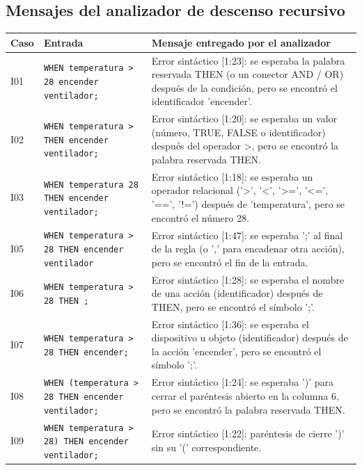 \subsection{Mensajes del analizador de descenso recursivo}
\begin{longtable}{@{}l >{\raggedright\arraybackslash}p{5.2cm} >{\raggedright\arraybackslash}p{8.4cm}@{}}
\toprule
\textbf{Caso} & \textbf{Entrada} & \textbf{Mensaje entregado por el analizador} \\
\midrule
\endhead
I01 & \footnotesize \texttt{WHEN temperatura > 28 encender ventilador;} & \footnotesize Error sintáctico [1:23]: se esperaba la palabra reservada THEN (o un conector AND / OR) después de la condición, pero se encontró el identificador 'encender'. \\
\addlinespace[2pt]
I02 & \footnotesize \texttt{WHEN temperatura > THEN encender ventilador;} & \footnotesize Error sintáctico [1:20]: se esperaba un valor (número, TRUE, FALSE o identificador) después del operador >, pero se encontró la palabra reservada THEN. \\
\addlinespace[2pt]
I03 & \footnotesize \texttt{WHEN temperatura 28 THEN encender ventilador;} & \footnotesize Error sintáctico [1:18]: se esperaba un operador relacional ('>', '<', '>=', '<=', '==', '!=') después de 'temperatura', pero se encontró el número 28. \\
\addlinespace[2pt]
I05 & \footnotesize \texttt{WHEN temperatura > 28 THEN encender ventilador} & \footnotesize Error sintáctico [1:47]: se esperaba ';' al final de la regla (o ',' para encadenar otra acción), pero se encontró el fin de la entrada. \\
\addlinespace[2pt]
I06 & \footnotesize \texttt{WHEN temperatura > 28 THEN ;} & \footnotesize Error sintáctico [1:28]: se esperaba el nombre de una acción (identificador) después de THEN, pero se encontró el símbolo ';'. \\
\addlinespace[2pt]
I07 & \footnotesize \texttt{WHEN temperatura > 28 THEN encender;} & \footnotesize Error sintáctico [1:36]: se esperaba el dispositivo u objeto (identificador) después de la acción 'encender', pero se encontró el símbolo ';'. \\
\addlinespace[2pt]
I08 & \footnotesize \texttt{WHEN (temperatura > 28 THEN encender ventilador;} & \footnotesize Error sintáctico [1:24]: se esperaba ')' para cerrar el paréntesis abierto en la columna 6, pero se encontró la palabra reservada THEN. \\
\addlinespace[2pt]
I09 & \footnotesize \texttt{WHEN temperatura > 28) THEN encender ventilador;} & \footnotesize Error sintáctico [1:22]: paréntesis de cierre ')' sin su '(' correspondiente. \\

\end{longtable}
